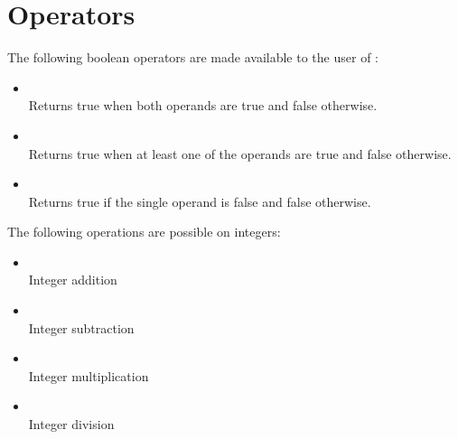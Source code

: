 \section{Operators}

The following boolean operators are made available to the user of \productname:


\begin{itemize}
  \item {}\\
    Returns true when both operands are true and false otherwise. 
  \item {}\\
    Returns true when at least one of the operands are true and false otherwise.
  \item {} \\
    Returns true if the single operand is false and false otherwise.
\end{itemize}

The following operations are possible on integers:

\begin{itemize}
  \item {} \\
    Integer addition
  \item {} \\
    Integer subtraction
  \item {} \\
    Integer multiplication
  \item {} \\
    Integer division
\end{itemize}
